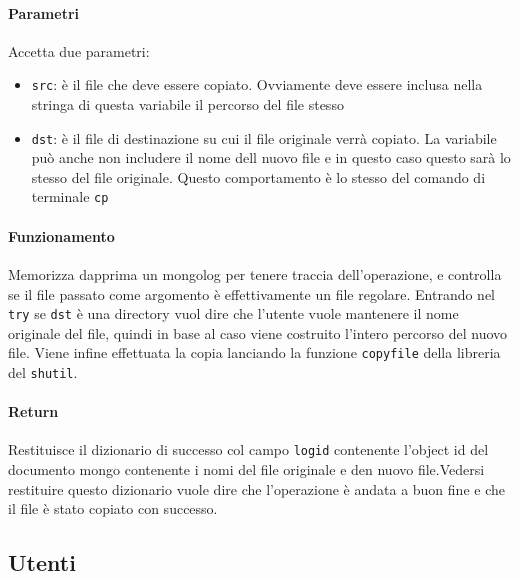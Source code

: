 \documentclass[11pt]{article}
\begin{document}
\paragraph{Parametri}
Accetta due parametri:
\begin{itemize}
	\item{\texttt{src}: è il file che deve essere copiato. Ovviamente deve essere inclusa nella stringa di questa variabile
		il percorso del file stesso}
	\item{\texttt{dst}: è il file di destinazione su cui il file originale verrà copiato. La variabile può anche non
		includere il nome dell nuovo file e in questo caso questo sarà lo stesso del file originale. Questo
		comportamento è lo stesso del comando di terminale \texttt{cp}}
\end{itemize}
\paragraph{Funzionamento}
Memorizza dapprima un mongolog per tenere traccia dell'operazione, e controlla se il file passato come argomento
è effettivamente un file regolare. Entrando nel \texttt{try} se \texttt{dst} è una directory
vuol dire che l'utente vuole mantenere il nome originale del file, quindi in base al caso viene costruito l'intero percorso
del nuovo file.
Viene infine effettuata la copia lanciando la funzione \texttt{copyfile} della libreria del \texttt{shutil}.
\paragraph{Return}
Restituisce il dizionario di successo col campo \texttt{logid} contenente l'object id del documento mongo contenente i nomi
del file originale e den nuovo file.Vedersi restituire questo dizionario vuole dire che l'operazione è andata a buon fine e che il file
è stato copiato con successo.

\subsection{Utenti}\label{users}
\end{document}
